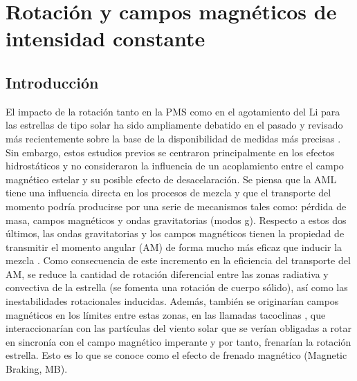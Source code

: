 
\chapter{Rotación y campos magnéticos de intensidad constante}\label{ch:tercer-capitulo}

\section{Introducción}

El impacto de la rotación tanto en la PMS como en el agotamiento del Li para las estrellas de tipo solar ha sido ampliamente debatido en el pasado \cite{Pinsonneault1997,Jeffries2004,Somers2014} y revisado más recientemente sobre la base de la disponibilidad de medidas más precisas \cite{Bouvier2016}. Sin embargo, estos estudios previos se centraron principalmente en los efectos hidrostáticos y no consideraron la influencia de un acoplamiento entre el campo magnético estelar y su posible efecto de desacelaración. Se piensa que la AML tiene una influencia directa en los procesos de mezcla y que el transporte del momento podría producirse por una serie de mecanismos tales como: pérdida de masa, campos magnéticos y ondas gravitatorias (modos g). Respecto a estos dos últimos, las ondas gravitatorias \cite{Charbonnel2005, Pincon2016} y los campos magnéticos \cite{Eggenberger2009} tienen la propiedad de transmitir el momento angular (AM) de forma mucho más eficaz que inducir la mezcla \cite{Denissenkov2007}. Como consecuencia de este incremento en la eficiencia del transporte del AM, se reduce la cantidad de rotación diferencial entre las zonas radiativa y convectiva de la estrella (se fomenta una rotación de cuerpo sólido), así como las inestabilidades rotacionales inducidas. Además, también se originarían campos magnéticos en los límites entre estas zonas, en las llamadas tacoclinas \cite{Aschwanden2014, Guerrero2016}, que interaccionarían con las partículas del viento solar que se verían obligadas a rotar en sincronía con el campo magnético imperante y por tanto, frenarían la rotación estrella. Esto es lo que se conoce como el efecto de frenado magnético (Magnetic Braking, MB). \par

